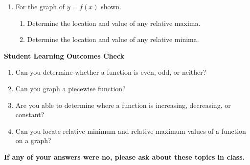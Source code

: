 \begin{enumerate}
\item For the graph of $y=f(x)$ shown.\\
\begin{enumerate}
\item Determine the location and value of any relative maxima.\\[.3in]
\item Determine the location and value of any relative minima.
\end{enumerate}

\vfill
\end{enumerate}

\noindent \textbf{Student Learning Outcomes Check}

\begin{enumerate}
\item Can you determine whether a function is even, odd, or neither?
\item Can you graph a piecewise function?
\item Are you able to determine where a function is increasing, decreasing, or constant?
\item  Can you locate relative minimum and relative maximum values of a function on a graph?

\end{enumerate}

\noindent \textbf{If any of your answers were no, please ask about these topics in class.}


